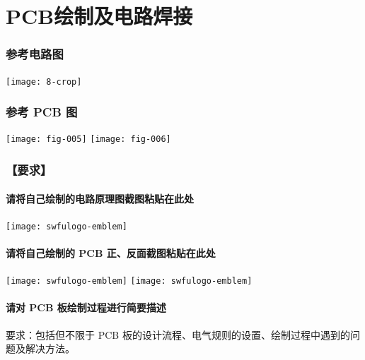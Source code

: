 \documentclass{swfulabreport}
\begin{document}
\section{PCB绘制及电路焊接}

\subsubsection{参考电路图}

\begin{center}
  \texttt{[image: 8-crop]}
\end{center}

\subsubsection{参考 PCB 图}

\begin{center}
  \texttt{[image: fig-005]}\quad
  \texttt{[image: fig-006]}
\end{center}

\subsubsection{【要求】}

\paragraph{请将自己绘制的电路原理图截图粘贴在此处}

\begin{center}
  \texttt{[image: swfulogo-emblem]}
\end{center}

\paragraph{请将自己绘制的 PCB 正、反面截图粘贴在此处}

\begin{center}
  \texttt{[image: swfulogo-emblem]}\qquad
  \texttt{[image: swfulogo-emblem]}
\end{center}

\paragraph{请对 PCB 板绘制过程进行简要描述}

要求：包括但不限于 PCB 板的设计流程、电气规则的设置、绘制过程中遇到的问
题及解决方法。

\zhlipsum[1-2]
\end{document}
